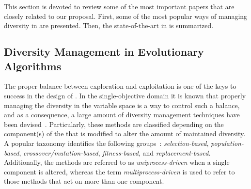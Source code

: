 This section is devoted to review some of the most important papers that are closely related to our proposal.
%
First, some of the most popular ways of managing diversity in \EAS{} are presented.
%
Then, the state-of-the-art in \MOEAS{} is summarized.

\subsection{Diversity Management in Evolutionary Algorithms}

The proper balance between exploration and exploitation is one of the keys to success in the design of \EAS{}.
%
In the single-objective domain it is known that properly managing the diversity in the variable space is a way to control such a balance,
and as a consequence, a large amount of diversity management techniques have been devised~\cite{Mohan:14}.
%
Particularly, these methods are classified depending on the component(s) of the \EA{} that is modified to alter the 
amount of maintained diversity.
%
A popular taxonomy identifies the following groups~\cite{Joel:Crepinsek}: \textit{selection-based}, \textit{population-based}, 
\textit{crossover/mutation-based}, \textit{fitness-based}, and \textit{replacement-based}.
%
Additionally, the methods are referred to as \textit{uniprocess-driven} when a single component is altered, whereas the term
\textit{multiprocess-driven} is used to refer to those methods that act on more than one component.

